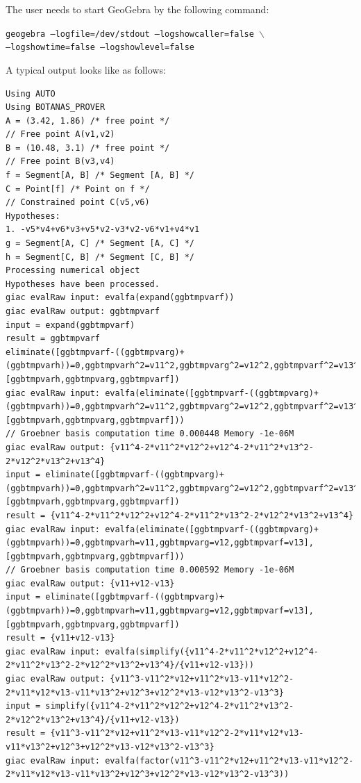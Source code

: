 \documentclass{article}
\begin{document}
The user needs to start GeoGebra by the following command:
{
    \begin{center}
        \texttt{geogebra --logfile=/dev/stdout --logshowcaller=false $\backslash$\\ --logshowtime=false --logshowlevel=false} 
    \end{center}
} %
A typical output looks like as follows:
{
\scriptsize
\begin{lstlisting}[language=mylog]
Using AUTO
Using BOTANAS_PROVER
A = (3.42, 1.86) /* free point */
// Free point A(v1,v2)
B = (10.48, 3.1) /* free point */
// Free point B(v3,v4)
f = Segment[A, B] /* Segment [A, B] */
C = Point[f] /* Point on f */
// Constrained point C(v5,v6)
Hypotheses:
1. -v5*v4+v6*v3+v5*v2-v3*v2-v6*v1+v4*v1
g = Segment[A, C] /* Segment [A, C] */
h = Segment[C, B] /* Segment [C, B] */
Processing numerical object
Hypotheses have been processed.
giac evalRaw input: evalfa(expand(ggbtmpvarf))
giac evalRaw output: ggbtmpvarf
input = expand(ggbtmpvarf)
result = ggbtmpvarf
eliminate([ggbtmpvarf-((ggbtmpvarg)+(ggbtmpvarh))=0,ggbtmpvarh^2=v11^2,ggbtmpvarg^2=v12^2,ggbtmpvarf^2=v13^2],[ggbtmpvarh,ggbtmpvarg,ggbtmpvarf])
giac evalRaw input: evalfa(eliminate([ggbtmpvarf-((ggbtmpvarg)+(ggbtmpvarh))=0,ggbtmpvarh^2=v11^2,ggbtmpvarg^2=v12^2,ggbtmpvarf^2=v13^2],[ggbtmpvarh,ggbtmpvarg,ggbtmpvarf]))
// Groebner basis computation time 0.000448 Memory -1e-06M
giac evalRaw output: {v11^4-2*v11^2*v12^2+v12^4-2*v11^2*v13^2-2*v12^2*v13^2+v13^4}
input = eliminate([ggbtmpvarf-((ggbtmpvarg)+(ggbtmpvarh))=0,ggbtmpvarh^2=v11^2,ggbtmpvarg^2=v12^2,ggbtmpvarf^2=v13^2],[ggbtmpvarh,ggbtmpvarg,ggbtmpvarf])
result = {v11^4-2*v11^2*v12^2+v12^4-2*v11^2*v13^2-2*v12^2*v13^2+v13^4}
giac evalRaw input: evalfa(eliminate([ggbtmpvarf-((ggbtmpvarg)+(ggbtmpvarh))=0,ggbtmpvarh=v11,ggbtmpvarg=v12,ggbtmpvarf=v13],[ggbtmpvarh,ggbtmpvarg,ggbtmpvarf]))
// Groebner basis computation time 0.000592 Memory -1e-06M
giac evalRaw output: {v11+v12-v13}
input = eliminate([ggbtmpvarf-((ggbtmpvarg)+(ggbtmpvarh))=0,ggbtmpvarh=v11,ggbtmpvarg=v12,ggbtmpvarf=v13],[ggbtmpvarh,ggbtmpvarg,ggbtmpvarf])
result = {v11+v12-v13}
giac evalRaw input: evalfa(simplify({v11^4-2*v11^2*v12^2+v12^4-2*v11^2*v13^2-2*v12^2*v13^2+v13^4}/{v11+v12-v13}))
giac evalRaw output: {v11^3-v11^2*v12+v11^2*v13-v11*v12^2-2*v11*v12*v13-v11*v13^2+v12^3+v12^2*v13-v12*v13^2-v13^3}
input = simplify({v11^4-2*v11^2*v12^2+v12^4-2*v11^2*v13^2-2*v12^2*v13^2+v13^4}/{v11+v12-v13})
result = {v11^3-v11^2*v12+v11^2*v13-v11*v12^2-2*v11*v12*v13-v11*v13^2+v12^3+v12^2*v13-v12*v13^2-v13^3}
giac evalRaw input: evalfa(factor(v11^3-v11^2*v12+v11^2*v13-v11*v12^2-2*v11*v12*v13-v11*v13^2+v12^3+v12^2*v13-v12*v13^2-v13^3))

\end{lstlisting}}
\end{document}
